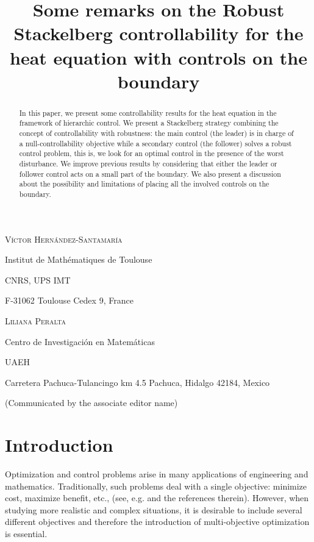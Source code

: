 \documentclass{aims}
\title[Robust Stackelberg controllability for the heat equation] %
      {Some remarks on the Robust Stackelberg controllability for the heat equation with controls on the boundary}
\author[V\'ictor Hern\'andez-Santamar\'ia and Liliana Peralta]{}
\theoremstyle{definition}
\begin{document}
\maketitle

\centerline{\scshape V\'ictor Hern\'andez-Santamar\'ia}
\medskip
{\footnotesize
 \centerline{Institut de Math\'{e}matiques de
    Toulouse}
   \centerline{CNRS, UPS IMT}
   \centerline{F-31062 Toulouse Cedex 9,
    France}
} %

\medskip

\centerline{\scshape Liliana Peralta}
\medskip
{\footnotesize
 \centerline{Centro de Investigaci\'on en Matem\'aticas}
   \centerline{UAEH}
   \centerline{Carretera Pachuca-Tulancingo km 4.5 Pachuca, Hidalgo 42184, Mexico}
}

\bigskip

 \centerline{(Communicated by the associate editor name)}


\begin{abstract}
In this paper, we present some controllability results for the heat equation in the framework of hierarchic control. We present a Stackelberg strategy combining the concept of controllability with robustness: the main control (the leader) is in charge of a null-controllability objective while a secondary control (the follower) solves a robust control problem, this is, we look for an optimal control in the presence of the worst disturbance. We improve previous results by considering that either the leader or follower control acts on a small part of the boundary.  We also present a discussion about the possibility and limitations of placing all the involved controls on the boundary. 
\end{abstract}

\section{Introduction}\label{sec_intro}
%
%
Optimization and control problems arise in many applications of engineering and mathematics. Traditionally, such problems deal with a single objective: minimize cost, maximize benefit, etc., (see, e.g. \cite{geering,trelat} and the references therein). However, when studying more realistic and complex situations, it is desirable to include several different objectives and therefore the introduction of multi-objective optimization is essential. 
\end{document}
